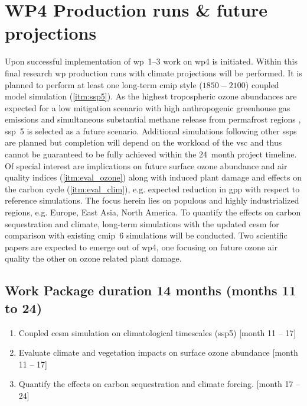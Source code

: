 \section{WP4 Production runs \& future projections}
\label{sec:wp4}
Upon successful implementation of \gls{wp}~1--3 work on \gls{wp}4 is initiated. Within this final research \gls{wp} production runs with climate projections will be performed. It is planned to perform at least one long-term \gls{cmip} style ($1850-2100$) coupled model simulation (\ref{itm:ssp5}). As the highest tropospheric ozone abundances are expected for a low mitigation scenario with high anthropogenic greenhouse gas emissions and simultaneous substantial methane release from permafrost regions \parencites[e.g.][]{JGR:Rieder2015}{AE:Rieder2018}, \gls{ssp}~5 is selected as a future scenario. Additional simulations following other \glspl{ssp} are planned but completion will depend on the workload of the \gls{vsc} and thus cannot be guaranteed to be fully achieved within the 24~month project timeline. Of special interest are implications on future surface ozone abundance and air quality indices (\ref{itm:eval_ozone}) along with induced plant damage and effects on the carbon cycle (\ref{itm:eval_clim}), e.g. expected reduction in \gls{gpp} with respect to reference simulations. The focus herein lies on populous and highly industrialized regions, e.g. Europe, East Asia, North America. To quantify the effects on carbon sequestration and climate, long-term simulations with the updated \gls{cesm} for comparison with existing \gls{cmip}~6 simulations will be conducted. Two scientific papers are expected to emerge out of \gls{wp}4, one focusing on future ozone air quality the other on ozone related plant damage.
{
\subsection*{Work Package duration 14 months (months 11 to 24)}
\begin{enumerate}[start=1,label={T4.\arabic*}]
  \itemsep0pt
\item Coupled \gls{cesm} simulation on climatological timescales (\gls{ssp}5) \hfill [month 11 -- 17]\label{itm:ssp5}
\item Evaluate climate and vegetation impacts on surface ozone abundance \hfill [month 11 -- 17]\label{itm:eval_ozone}
\item Quantify the effects on carbon sequestration and climate forcing. \hfill [month 17 -- 24]\label{itm:eval_clim}
\end{enumerate}
}

